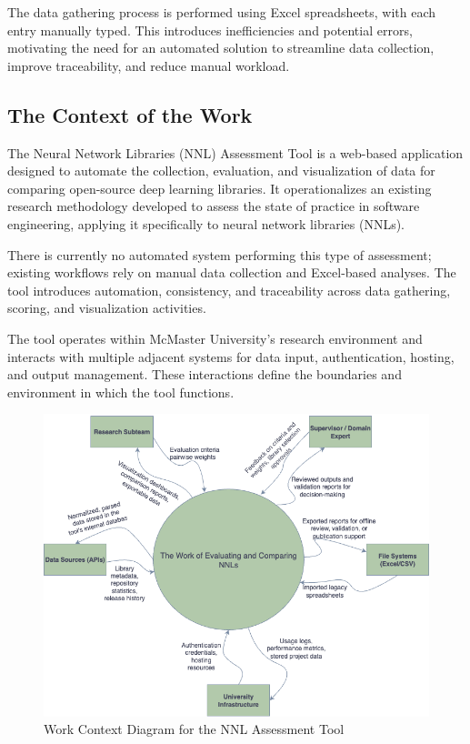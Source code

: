 \documentclass[12pt]{article}
\begin{document}
The data gathering process is performed using Excel spreadsheets, with each entry manually typed. This introduces inefficiencies and potential errors, motivating the need for an automated solution to streamline data collection, improve traceability, and reduce manual workload.

\subsection{The Context of the Work}
The Neural Network Libraries (NNL) Assessment Tool is a web-based application designed to automate the collection, evaluation, and visualization of data for comparing open-source deep learning libraries. It operationalizes an existing research methodology developed to assess the state of practice in software engineering, applying it specifically to neural network libraries (NNLs).

There is currently no automated system performing this type of assessment; existing workflows rely on manual data collection and Excel-based analyses. The tool introduces automation, consistency, and traceability across data gathering, scoring, and visualization activities.

The tool operates within McMaster University’s research environment and interacts with multiple adjacent systems for data input, authentication, hosting, and output management. These interactions define the boundaries and environment in which the tool functions.

\begin{figure}[H]
    \centering
    \includegraphics[width=\textwidth]{images/context-diagram.png}
    \caption{Work Context Diagram for the NNL Assessment Tool}
    \label{fig:context-diagram}
\end{figure}
\end{document}
